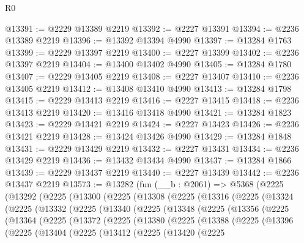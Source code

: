 \begin{lexlean}{R0}
\begin{coremodule}
@13391 := @2229 @13389 @2219
@13392 := @2227 @13391
@13394 := @2236 @13389 @2219
@13396 := @13392 @13394 @4990
@13397 := @13284 @1763
@13399 := @2229 @13397 @2219
@13400 := @2227 @13399
@13402 := @2236 @13397 @2219
@13404 := @13400 @13402 @4990
@13405 := @13284 @1780
@13407 := @2229 @13405 @2219
@13408 := @2227 @13407
@13410 := @2236 @13405 @2219
@13412 := @13408 @13410 @4990
@13413 := @13284 @1798
@13415 := @2229 @13413 @2219
@13416 := @2227 @13415
@13418 := @2236 @13413 @2219
@13420 := @13416 @13418 @4990
@13421 := @13284 @1823
@13423 := @2229 @13421 @2219
@13424 := @2227 @13423
@13426 := @2236 @13421 @2219
@13428 := @13424 @13426 @4990
@13429 := @13284 @1848
@13431 := @2229 @13429 @2219
@13432 := @2227 @13431
@13434 := @2236 @13429 @2219
@13436 := @13432 @13434 @4990
@13437 := @13284 @1866
@13439 := @2229 @13437 @2219
@13440 := @2227 @13439
@13442 := @2236 @13437 @2219
@13573 := @13282
    (fun (__b : @2061) =>
    @5368
      (@2225
        (@13292
          (@2225
            (@13300
              (@2225
                (@13308
                  (@2225
                    (@13316
                      (@2225
                        (@13324
                          (@2225
                            (@13332
                              (@2225
                                (@13340
                                  (@2225
                                    (@13348
                                      (@2225
                                        (@13356
                                          (@2225
                                            (@13364
                                              (@2225
                                                (@13372
                                                  (@2225
                                                    (@13380
                                                      (@2225
                                                        (@13388
                                                          (@2225
                                                            (@13396
                                                              (@2225
                                                                (@13404
                                                                  (@2225
                                                                    (@13412
                                                                      (@2225
                                                                        (@13420
                                                                          (@2225

\end{coremodule}
\end{lexlean}
